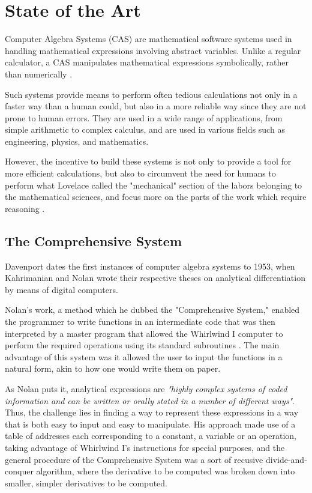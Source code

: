 \chapter{State of the Art}\label{chap:state-of-the-art}

Computer Algebra Systems (CAS) are mathematical software systems used in handling mathematical expressions involving abstract variables. Unlike a regular calculator, a CAS manipulates mathematical expressions symbolically, rather than numerically \parencite{bou2009computer}.

Such systems provide means to perform often tedious calculations not only in a faster way than a human could, but also in a more reliable way since they are not prone to human errors. They are used in a wide range of applications, from simple arithmetic to complex calculus, and are used in various fields such as engineering, physics, and mathematics.

However, the incentive to build these systems is not only to provide a tool for more efficient calculations, but also to circumvent the need for humans to perform what Lovelace called the "mechanical" section of the labors belonging to the mathematical sciences, and focus more on the parts of the work which require reasoning \parencite{lovelace1842sketch}.

\section{The Comprehensive System}\label{sec:the-comprehensive-system}

Davenport \parencite*{davenport1994computer} dates the first instances of computer algebra systems to 1953, when Kahrimanian and Nolan wrote their respective theses on analytical differentiation by means of digital computers.

Nolan's work, a method which he dubbed the "Comprehensive System," enabled the programmer to write functions in an intermediate code that was then interpreted by a master program that allowed the Whirlwind I computer to perform the required operations using its standard subroutines \parencite{nolan1953analytical}. The main advantage of this system was it allowed the user to input the functions in a natural form, akin to how one would write them on paper.

As Nolan \parencite*{nolan1953analytical} puts it, analytical expressions are \textit{"highly complex systems of coded information and can be written or orally stated in a number of different ways"}. Thus, the challenge lies in finding a way to represent these expressions in a way that is both easy to input and easy to manipulate. His approach made use of a table of addresses each corresponding to a constant, a variable or an operation, taking advantage of Whirlwind I's instructions for special purposes, and the general procedure of the Comprehensive System was a sort of recusive divide-and-conquer algorithm, where the derivative to be computed was broken down into smaller, simpler derivatives to be computed.

